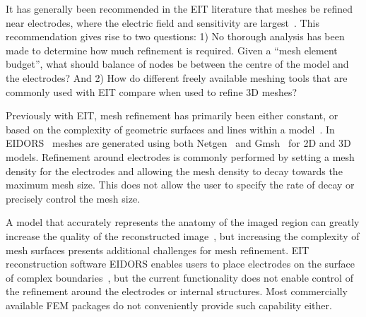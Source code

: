 

It has generally been recommended in the EIT literature 
that meshes be refined near electrodes, where the electric 
field and sensitivity are largest~\parencite{adler_electrical_2017}. 
This recommendation gives rise to two questions: 
1) No thorough analysis has been made to determine how much 
refinement is required. Given a ``mesh element budget'', what should
balance of nodes be between the centre of the model and the electrodes? And 
2) How do different freely available meshing tools that are
commonly used with EIT compare when used to refine 3D meshes?

Previously with EIT, mesh refinement has primarily been either 
constant, or based on 
the complexity of geometric surfaces and lines within a model~\parencite{grychtol_fem_2013}.  
In EIDORS~\parencite{adler_uses_2006} meshes are generated using both 
Netgen~\parencite{schoberl_netgen_1997} and Gmsh~\parencite{geuzaine_gmsh_2009} 
for 2D and 3D models. 
Refinement around electrodes is commonly performed by 
setting a mesh density for the electrodes and allowing the mesh density to 
decay towards the maximum mesh size. This does not allow the user to specify 
the rate of decay or precisely control the mesh size.   

A model that accurately represents the anatomy of the imaged region 
can greatly increase the quality of the reconstructed image~\parencite{grychtol_impact_2012},
but increasing the complexity of mesh surfaces presents additional challenges for
mesh refinement.  EIT reconstruction software EIDORS enables users to place electrodes on the surface of complex 
boundaries~\parencite{grychtol_fem_2013}, but the current functionality does not  
enable control of the refinement around the electrodes or internal 
structures.
Most commercially available FEM packages
do not conveniently provide such capability either.

